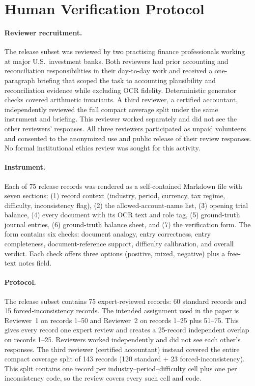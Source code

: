 \section{Human Verification Protocol}
\label{appx:human-protocol}

\paragraph{Reviewer recruitment.}
The release subset was reviewed by two practising finance professionals working at major U.S.\ investment banks. Both reviewers had prior accounting and reconciliation responsibilities in their day-to-day work and received a one-paragraph briefing that scoped the task to accounting plausibility and reconciliation evidence while excluding OCR fidelity. Deterministic generator checks covered arithmetic invariants. A third reviewer, a certified accountant, independently reviewed the full compact coverage split under the same instrument and briefing. This reviewer worked separately and did not see the other reviewers' responses. All three reviewers participated as unpaid volunteers and consented to the anonymized use and public release of their review responses. No formal institutional ethics review was sought for this activity.

\paragraph{Instrument.}
Each of 75 release records was rendered as a self-contained Markdown file with seven sections: (1) record context (industry, period, currency, tax regime, difficulty, inconsistency flag), (2) the allowed-account-name list, (3) opening trial balance, (4) every document with its OCR text and role tag, (5) ground-truth journal entries, (6) ground-truth balance sheet, and (7) the verification form. The form contains six checks: document analogy, entry correctness, entry completeness, document-reference support, difficulty calibration, and overall verdict. Each check offers three options (positive, mixed, negative) plus a free-text notes field.

\paragraph{Protocol.}
The release subset contains 75 expert-reviewed records: 60 standard records and 15 forced-inconsistency records. The intended assignment used in the paper is Reviewer~1 on records 1--50 and Reviewer~2 on records 1--25 plus 51--75. This gives every record one expert review and creates a 25-record independent overlap on records 1--25. Reviewers worked independently and did not see each other's responses. The third reviewer (certified accountant) instead covered the entire compact coverage split of 143 records (120 standard + 23 forced-inconsistency). This split contains one record per industry--period--difficulty cell plus one per inconsistency code, so the review covers every such cell and code.

